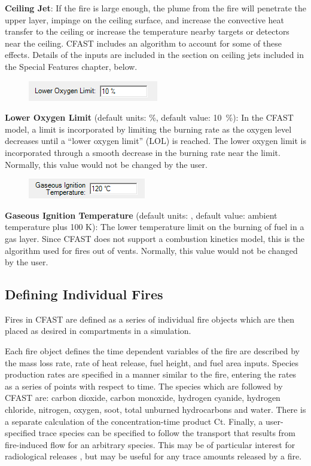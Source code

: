 \textbf{Ceiling Jet}: If the fire is large enough, the plume from the fire will penetrate the upper layer, impinge on the ceiling surface, and increase the convective heat transfer to the ceiling or increase the temperature nearby targets or detectors near the ceiling.  CFAST includes an algorithm to account for some of these effects.  Details of the inputs are included in the section on ceiling jets included in the Special Features chapter, below.

\begin{figure}
  \includegraphics[width=2.240in]{FIGURES/Input_File/LOL}
\end{figure}

\textbf{Lower Oxygen Limit} (default units: \%, default value: 10~\%):  In the CFAST model, a limit is incorporated by limiting the burning rate as the oxygen level decreases until a ``lower oxygen limit'' (LOL) is reached. The lower oxygen limit is incorporated through a smooth decrease in the burning rate near the limit. Normally, this value would not be changed by the user.

\begin{figure}
  \includegraphics[width=2.021in]{FIGURES/Input_File/Gaseous_Ignition_Temperature}
\end{figure}

\textbf{Gaseous Ignition Temperature} (default units: \degc, default value: ambient temperature plus 100 K): The lower temperature limit on the burning of fuel in a gas layer. Since CFAST does not support a combustion kinetics model, this is the algorithm used for fires out of vents.  Normally, this value would not be changed by the user.

\subsection{Defining Individual Fires}

Fires in CFAST are defined as a series of individual fire objects which are then placed as desired in compartments in a simulation.

Each fire object defines the time dependent variables of the fire are described by the mass loss rate, rate of heat release, fuel height, and fuel area inputs.  Species production rates are specified in a manner similar to the fire, entering the rates as a series of points with respect to time.  The species which are followed by CFAST are: carbon dioxide, carbon monoxide, hydrogen cyanide, hydrogen chloride, nitrogen, oxygen, soot, total unburned hydrocarbons and water. There is a separate calculation of the concentration-time product Ct. Finally, a user-specified trace species can be specified to follow the transport that results from fire-induced flow for an arbitrary species. This may be of particular interest for radiological releases \cite{Jones:2008}, but may be useful for any trace amounts released by a fire.

